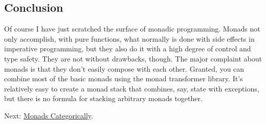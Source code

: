 \subsection{Conclusion}\label{conclusion}

Of course I have just scratched the surface of monadic programming.
Monads not only accomplish, with pure functions, what normally is done
with side effects in imperative programming, but they also do it with a
high degree of control and type safety. They are not without drawbacks,
though. The major complaint about monads is that they don't easily
compose with each other. Granted, you can combine most of the basic
monads using the monad transformer library. It's relatively easy to
create a monad stack that combines, say, state with exceptions, but
there is no formula for stacking arbitrary monads together.

Next:
\href{https://bartoszmilewski.com/2016/12/27/monads-categorically/}{Monads
Categorically}.
